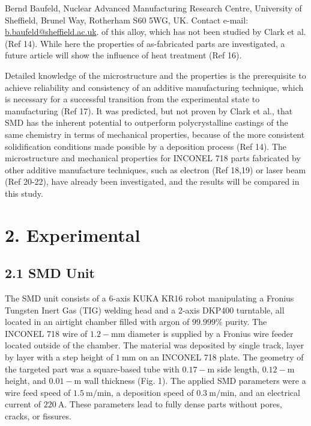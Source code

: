 \documentclass[10pt]{article}
\begin{document}
Bernd Baufeld, Nuclear Advanced Manufacturing Research Centre, University of Sheffield, Brunel Way, Rotherham S60 5WG, UK. Contact e-mail: \href{mailto:b.baufeld@sheffield.ac.uk}{b.baufeld@sheffield.ac.uk}. of this alloy, which has not been studied by Clark et al. (Ref 14). While here the properties of as-fabricated parts are investigated, a future article will show the influence of heat treatment (Ref 16).

Detailed knowledge of the microstructure and the properties is the prerequisite to achieve reliability and consistency of an additive manufacturing technique, which is necessary for a successful transition from the experimental state to manufacturing (Ref 17). It was predicted, but not proven by Clark et al., that SMD has the inherent potential to outperform polycrystalline castings of the same chemistry in terms of mechanical properties, because of the more consistent solidification conditions made possible by a deposition process (Ref 14). The microstructure and mechanical properties for INCONEL 718 parts fabricated by other additive manufacture techniques, such as electron (Ref 18,19) or laser beam (Ref 20-22), have already been investigated, and the results will be compared in this study.

\section*{2. Experimental}
\subsection*{2.1 SMD Unit}
The SMD unit consists of a 6-axis KUKA KR16 robot manipulating a Fronius Tungsten Inert Gas (TIG) welding head and a 2-axis DKP400 turntable, all located in an airtight chamber filled with argon of $99.999 \%$ purity. The INCONEL 718 wire of $1.2-\mathrm{mm}$ diameter is supplied by a Fronius wire feeder located outside of the chamber. The material was deposited by single track, layer by layer with a step height of $1 \mathrm{~mm}$ on an INCONEL 718 plate. The geometry of the targeted part was a square-based tube with $0.17-\mathrm{m}$ side length, $0.12-\mathrm{m}$ height, and $0.01-\mathrm{m}$ wall thickness (Fig. 1). The applied SMD parameters were a wire feed speed of $1.5 \mathrm{~m} / \mathrm{min}$, a deposition speed of $0.3 \mathrm{~m} / \mathrm{min}$, and an electrical current of $220 \mathrm{~A}$. These parameters lead to fully dense parts without pores, cracks, or fissures.
\end{document}
